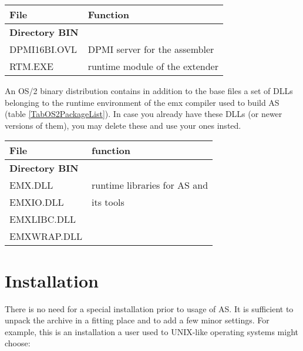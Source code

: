 \documentclass[12pt,twoside]{report}
\begin{document}
\begin{table*}[htp]
\begin{center}\begin{tabular}{|l|l|}
\hline
File              & Function \\
\hline
\hline
{\bf Directory BIN} & \\
\hline
DPMI16BI.OVL   & DPMI server for the assembler \\
RTM.EXE        & runtime module of the extender \\
\hline
\end{tabular}\end{center}
\caption{Additional Files in a DPMI Binary Distribution
         \label{TabDPMIPackageList}}
\end{table*}

An OS/2 binary distribution  contains in addition to
the base files a set of DLLs belonging to the runtime environment of the
emx compiler used to build AS (table \ref{TabOS2PackageList}).  In case
you already have these DLLs (or newer versions of them), you may delete
these and use your ones insted.

\begin{table*}[htp]
\begin{center}\begin{tabular}{|l|l|}
\hline
File              & function \\
\hline
\hline
{\bf Directory BIN} & \\
\hline
EMX.DLL           & runtime libraries for AS and \\
EMXIO.DLL         & its tools \\
EMXLIBC.DLL       & \\
EMXWRAP.DLL       & \\
\hline
\end{tabular}\end{center}
\caption{Additional Files in an OS/2 binary distribution
         \label{TabOS2PackageList}}
\end{table*}


\section{Installation}

There is no need for a  special installation prior to
usage of AS.  It is sufficient to unpack the archive in a fitting place
and to add a few minor settings.  For example, this is an installation a
user used to UNIX-like operating systems might choose:
\end{document}

